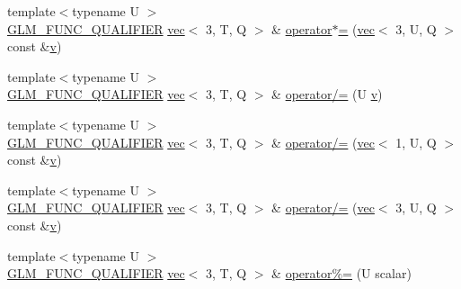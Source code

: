 \begin{DoxyCompactItemize}
\item 
{\footnotesize template$<$typename U $>$ }\\\mbox{\hyperlink{setup_8hpp_a33fdea6f91c5f834105f7415e2a64407}{G\+L\+M\+\_\+\+F\+U\+N\+C\+\_\+\+Q\+U\+A\+L\+I\+F\+I\+ER}} \mbox{\hyperlink{structglm_1_1vec}{vec}}$<$ 3, T, Q $>$ \& \mbox{\hyperlink{structglm_1_1vec_3_013_00_01_t_00_01_q_01_4_a20170b8b71ce0a479ea43b5d4690a1a5}{operator$\ast$=}} (\mbox{\hyperlink{structglm_1_1vec}{vec}}$<$ 3, U, Q $>$ const \&\mbox{\hyperlink{_s_d_l__opengl_8h_a10a82eabcb59d2fcd74acee063775f90}{v}})
\item 
{\footnotesize template$<$typename U $>$ }\\\mbox{\hyperlink{setup_8hpp_a33fdea6f91c5f834105f7415e2a64407}{G\+L\+M\+\_\+\+F\+U\+N\+C\+\_\+\+Q\+U\+A\+L\+I\+F\+I\+ER}} \mbox{\hyperlink{structglm_1_1vec}{vec}}$<$ 3, T, Q $>$ \& \mbox{\hyperlink{structglm_1_1vec_3_013_00_01_t_00_01_q_01_4_a04e2525807011b5085f89df8dd94ff3d}{operator/=}} (U \mbox{\hyperlink{_s_d_l__opengl_8h_a10a82eabcb59d2fcd74acee063775f90}{v}})
\item 
{\footnotesize template$<$typename U $>$ }\\\mbox{\hyperlink{setup_8hpp_a33fdea6f91c5f834105f7415e2a64407}{G\+L\+M\+\_\+\+F\+U\+N\+C\+\_\+\+Q\+U\+A\+L\+I\+F\+I\+ER}} \mbox{\hyperlink{structglm_1_1vec}{vec}}$<$ 3, T, Q $>$ \& \mbox{\hyperlink{structglm_1_1vec_3_013_00_01_t_00_01_q_01_4_a54e324b77b2efc8926c0436608709799}{operator/=}} (\mbox{\hyperlink{structglm_1_1vec}{vec}}$<$ 1, U, Q $>$ const \&\mbox{\hyperlink{_s_d_l__opengl_8h_a10a82eabcb59d2fcd74acee063775f90}{v}})
\item 
{\footnotesize template$<$typename U $>$ }\\\mbox{\hyperlink{setup_8hpp_a33fdea6f91c5f834105f7415e2a64407}{G\+L\+M\+\_\+\+F\+U\+N\+C\+\_\+\+Q\+U\+A\+L\+I\+F\+I\+ER}} \mbox{\hyperlink{structglm_1_1vec}{vec}}$<$ 3, T, Q $>$ \& \mbox{\hyperlink{structglm_1_1vec_3_013_00_01_t_00_01_q_01_4_ace726247678030918d73ae2206dcacbe}{operator/=}} (\mbox{\hyperlink{structglm_1_1vec}{vec}}$<$ 3, U, Q $>$ const \&\mbox{\hyperlink{_s_d_l__opengl_8h_a10a82eabcb59d2fcd74acee063775f90}{v}})
\item 
{\footnotesize template$<$typename U $>$ }\\\mbox{\hyperlink{setup_8hpp_a33fdea6f91c5f834105f7415e2a64407}{G\+L\+M\+\_\+\+F\+U\+N\+C\+\_\+\+Q\+U\+A\+L\+I\+F\+I\+ER}} \mbox{\hyperlink{structglm_1_1vec}{vec}}$<$ 3, T, Q $>$ \& \mbox{\hyperlink{structglm_1_1vec_3_013_00_01_t_00_01_q_01_4_a4b64d60016fdc6a48a5003aa67e9de29}{operator\%=}} (U scalar)

\end{DoxyCompactItemize}

